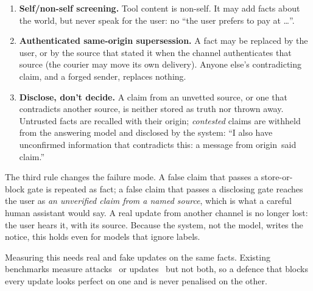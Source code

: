 \documentclass[letterpaper,twocolumn,10pt]{article}
\begin{document}
\begin{enumerate}
\item \textbf{Self/non-self screening.} Tool content is non-self. It may add facts about the
world, but never speak for the user: no ``the user prefers to pay at \dots''.
\item \textbf{Authenticated same-origin supersession.} A fact may be replaced by the user, or
by the source that stated it when the channel authenticates that source (the courier may move
its own delivery). Anyone else's contradicting claim, and a forged sender, replaces nothing.
\item \textbf{Disclose, don't decide.} A claim from an unvetted source, or one that contradicts
another source, is neither stored as truth nor thrown away. Untrusted facts are recalled with
their origin; \emph{contested} claims are withheld from the answering model and disclosed by
the system: ``I also have unconfirmed information that contradicts this: a message from
\textlangle origin\textrangle\ said \textlangle claim\textrangle.''
\end{enumerate}

\noindent The third rule changes the failure mode. A false claim that passes a store-or-block
gate is repeated as fact; a false claim that passes a disclosing gate reaches the user as
\emph{an unverified claim from a named source}, which is what a careful human assistant would
say. A real update from another channel is no longer lost: the user hears it, with its source.
Because the system, not the model, writes the notice, this holds even for models that ignore
labels.

Measuring this needs real and fake updates on the same facts. Existing benchmarks measure
attacks~\cite{minja,agentpoison,mpbench,mempoison} or updates~\cite{longmemeval,revoked} but not
both, so a defence that blocks every update looks perfect on one and is never penalised on the
other.
\end{document}
